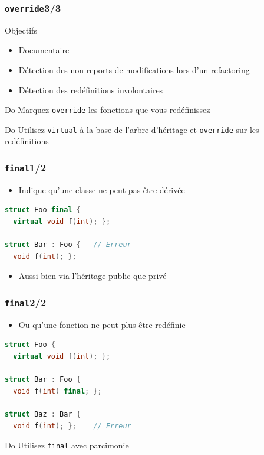 \documentclass[C++.tex]{subfiles}
\begin{document}
\begin{frame}[fragile]
	\frametitle{\lstinline|override|\titlehfill{}3/3}
	\begin{block}{Objectifs}
		\begin{itemize}
			\item Documentaire
			\item Détection des non-reports de modifications lors d'un refactoring
			\item Détection des redéfinitions involontaires
		\end{itemize}
	\end{block}

	\begin{exampleblock}{Do}
		Marquez \lstinline|override| les fonctions que vous redéfinissez
	\end{exampleblock}

	\begin{exampleblock}{Do}
		Utilisez \lstinline|virtual| à la base de l'arbre d'héritage et \lstinline|override| sur les redéfinitions

	\end{exampleblock}
\end{frame}

\begin{frame}[fragile]
	\frametitle{\lstinline|final|\titlehfill{}1/2}
	\begin{itemize}
		\item Indique qu'une classe ne peut pas être dérivée
	\end{itemize}

	\begin{lstlisting}[language=C++]
struct Foo final {
  virtual void f(int); };

struct Bar : Foo {   // Erreur
  void f(int); };
\end{lstlisting}

	\begin{itemize}
		\item Aussi bien via l'héritage public que privé
	\end{itemize}
\end{frame}

\begin{frame}[fragile]
	\frametitle{\lstinline|final|\titlehfill{}2/2}
	\begin{itemize}
		\item Ou qu'une fonction ne peut plus être redéfinie
	\end{itemize}

	\begin{lstlisting}[language=C++]
struct Foo {
  virtual void f(int); };

struct Bar : Foo {
  void f(int) final; };

struct Baz : Bar {
  void f(int); };    // Erreur\end{lstlisting}

	\begin{exampleblock}{Do}
		Utilisez \lstinline|final| avec parcimonie
	\end{exampleblock}
\end{frame}
\end{document}
